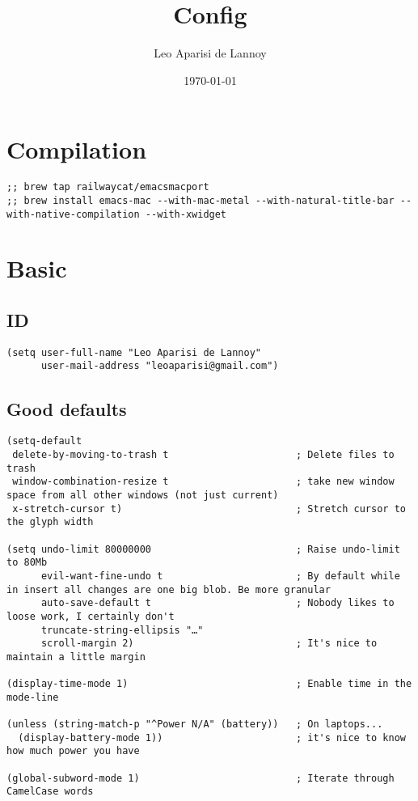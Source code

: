 \documentclass[c]{article}
\author{Leo Aparisi de Lannoy}
\date{\today}
\title{Config}
\theoremstyle{plain}%
\theoremstyle{definition}
\theoremstyle{remark}
\renewcommand{\tableofcontents}{\begingroup\hypersetup{hidelinks}\oldtoc\endgroup}
\begin{document}
\maketitle
\tableofcontents

\section{Compilation}
\label{sec:org893613f}
\begin{verbatim}
;; brew tap railwaycat/emacsmacport
;; brew install emacs-mac --with-mac-metal --with-natural-title-bar --with-native-compilation --with-xwidget
\end{verbatim}
\section{Basic}
\label{sec:org019876c}
\subsection{ID}
\label{sec:org7345421}
\begin{verbatim}
(setq user-full-name "Leo Aparisi de Lannoy"
      user-mail-address "leoaparisi@gmail.com")
\end{verbatim}
\subsection{Good defaults}
\label{sec:org59ae812}
\begin{verbatim}
(setq-default
 delete-by-moving-to-trash t                      ; Delete files to trash
 window-combination-resize t                      ; take new window space from all other windows (not just current)
 x-stretch-cursor t)                              ; Stretch cursor to the glyph width

(setq undo-limit 80000000                         ; Raise undo-limit to 80Mb
      evil-want-fine-undo t                       ; By default while in insert all changes are one big blob. Be more granular
      auto-save-default t                         ; Nobody likes to loose work, I certainly don't
      truncate-string-ellipsis "…"
      scroll-margin 2)                            ; It's nice to maintain a little margin

(display-time-mode 1)                             ; Enable time in the mode-line

(unless (string-match-p "^Power N/A" (battery))   ; On laptops...
  (display-battery-mode 1))                       ; it's nice to know how much power you have

(global-subword-mode 1)                           ; Iterate through CamelCase words
\end{verbatim}
\end{document}
